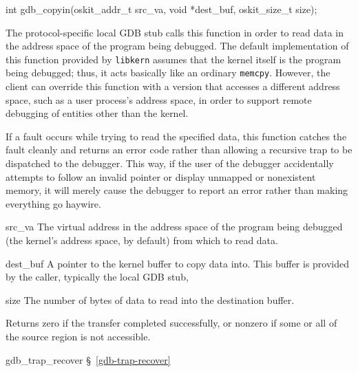 \label{gdb-copyin}
\begin{apisyn}

	\funcproto int gdb_copyin(oskit_addr_t src_va, void *dest_buf,
				  oskit_size_t size);
\end{apisyn}
\begin{apidesc}
	The protocol-specific local GDB stub
	calls this function in order to read data
	in the address space of the program being debugged.
	The default implementation of this function provided by {\tt libkern}
	assumes that the kernel itself is the program being debugged;
	thus, it acts basically like an ordinary {\tt memcpy}.
	However, the client can override this function
	with a version that accesses a different address space,
	such as a user process's address space,
	in order to support remote debugging of entities other than the kernel.

	If a fault occurs while trying to read the specified data,
	this function catches the fault cleanly and returns an error code
	rather than allowing a recursive trap to be dispatched to the debugger.
	This way, if the user of the debugger
	accidentally attempts to follow an invalid pointer
	or display unmapped or nonexistent memory,
	it will merely cause the debugger to report an error
	rather than making everything go haywire.
\end{apidesc}
\begin{apiparm}
	\item[src_va]
		The virtual address
		in the address space of the program being debugged
		(the kernel's address space, by default)
		from which to read data.
	\item[dest_buf]
		A pointer to the kernel buffer to copy data into.
		This buffer is provided by the caller,
		typically the local GDB stub,
	\item[size]
		The number of bytes of data to read into the destination buffer.
\end{apiparm}
\begin{apiret}
	Returns zero if the transfer completed successfully,
	or nonzero if some or all of the source region is not accessible.
\end{apiret}
\begin{apidep}
	\item[gdb_trap_recover]		\S~\ref{gdb-trap-recover}
\end{apidep}

